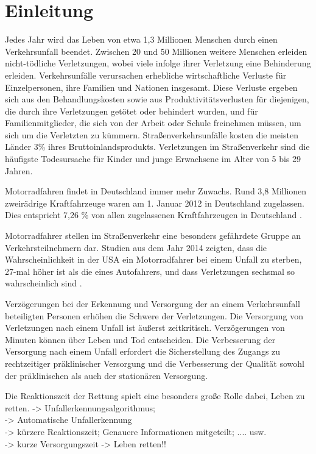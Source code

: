 \chapter{Einleitung}
%
%
%
%
%
%
Jedes Jahr wird das Leben von etwa 1,3 Millionen Menschen durch einen Verkehrsunfall beendet. Zwischen 20 und 50 Millionen weitere Menschen erleiden nicht-tödliche Verletzungen, wobei viele infolge ihrer Verletzung eine Behinderung erleiden. Verkehrsunfälle verursachen erhebliche wirtschaftliche Verluste für Einzelpersonen, ihre Familien und Nationen insgesamt. Diese Verluste ergeben sich aus den Behandlungskosten sowie aus Produktivitätsverlusten für diejenigen, die durch ihre Verletzungen getötet oder behindert wurden, und für Familienmitglieder, die sich von der Arbeit oder Schule freinehmen müssen, um sich um die Verletzten zu kümmern. Straßenverkehrsunfälle kosten die meisten Länder 3\% ihres Bruttoinlandsprodukts. Verletzungen im Straßenverkehr sind die häufigste Todesursache für Kinder und junge Erwachsene im Alter von 5 bis 29 Jahren.\citep{healthorganization2022}

Motorradfahren findet in Deutschland immer mehr Zuwachs.  Rund 3,8 Millionen zweirädrige Kraftfahrzeuge waren am 1. Januar 2012 in Deutschland zugelassen. Dies entspricht 7,26 \% von allen zugelassenen Kraftfahrzeugen in Deutschland \citep{Haedrich2012}.

Motorradfahrer stellen im Straßenverkehr eine besonders gefährdete Gruppe an Verkehrsteilnehmern dar. Studien aus dem Jahr 2014 zeigten, dass die Wahrscheinlichkeit in der USA ein Motorradfahrer bei einem Unfall zu sterben, 27-mal höher ist als die eines Autofahrers, und dass Verletzungen sechsmal so wahrscheinlich sind \citep{NHTSA}.

Verzögerungen bei der Erkennung und Versorgung der an einem Verkehrsunfall beteiligten Personen erhöhen die Schwere der Verletzungen. Die Versorgung von Verletzungen nach einem Unfall ist äußerst zeitkritisch. Verzögerungen von Minuten können über Leben und Tod entscheiden. Die Verbesserung der Versorgung nach einem Unfall erfordert die Sicherstellung des Zugangs zu rechtzeitiger präklinischer Versorgung und die Verbesserung der Qualität sowohl der präklinischen als auch der stationären Versorgung.\citep{healthorganization2022}

Die Reaktionszeit der Rettung spielt eine besonders große Rolle dabei, Leben zu retten.
-> Unfallerkennungsalgorithmus; \\
-> Automatische Unfallerkennung \\
-> kürzere Reaktionszeit; Genauere Informationen mitgeteilt; .... usw.\\
-> kurze Versorgungszeit -> Leben retten!!\\

